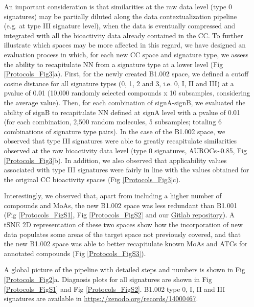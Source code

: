 An important consideration is that similarities at the raw data level (type 0 signatures) may be partially diluted along the data contextualization pipeline (e.g. at type III signature level), when the data is eventually compressed and integrated with all the bioactivity data already contained in the CC. To further illustrate which spaces may be more affected in this regard, we have designed an evaluation process in which, for each new CC space and signature type, we assess the ability to recapitulate NN from a signature type at a lower level (Fig \ref{Protocols_Fig3}a). First, for the newly created B1.002 space, we defined a cutoff cosine distance for all signature types (0, 1, 2 and 3, i.e. 0, I, II and III) at a pvalue of 0.01 (10,000 randomly selected compounds x 10 subsamples, considering the average value). Then, for each combination of signA-signB, we evaluated the ability of signB to recapitulate NN defined at signA level with a pvalue of 0.01 (for each combination, 2,500 random molecules, 5 subsamples; totaling 6 combinations of signature type pairs). In the case of the B1.002 space, we observed that type III signatures were able to greatly recapitulate similarities observed at the raw bioactivity data level (type 0 signatures, AUROCs\textasciitilde0.85, Fig \ref{Protocols_Fig3}b). In addition, we also observed that applicability values associated with type III signatures were fairly in line with the values obtained for the original CC bioactivity spaces (Fig \ref{Protocols_Fig3}c).

Interestingly, we observed that, apart from including a higher number of compounds and MoAs, the new B1.002 space was less redundant than B1.001 (Fig \ref{Protocols_FigS1}, Fig \ref{Protocols_FigS2} and our \href{https://gitlabsbnb.irbbarcelona.org/packages/protocols}{Gitlab repository}). A tSNE 2D representation of these two spaces show how the incorporation of new data populates some areas of the target space not previously covered, and that the new B1.002 space was able to better recapitulate known MoAs and ATCs for annotated compounds (Fig \ref{Protocols_FigS3}). 

A global picture of the pipeline with detailed steps and numbers is shown in Fig \ref{Protocols_Fig2}a. Diagnosis plots for all signatures are shown in Fig \ref{Protocols_FigS1} and Fig \ref{Protocols_FigS2}. B1.002 type 0, I, II and III signatures are available in \hyperlink{https://zenodo.org/records/14000467}{https://zenodo.org/records/14000467}. 

